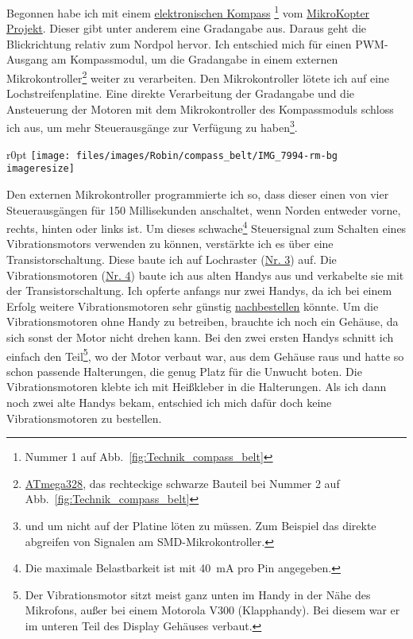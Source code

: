 Begonnen habe ich mit einem
\href{http://www.mikrokopter.de/ucwiki/MK3Mag}{elektronischen Kompass}%
\footnote{Nummer 1 auf Abb.~\vref{fig:Technik_compass_belt}}
vom \href{http://www.mikrokopter.de}{MikroKopter Projekt}.
Dieser gibt unter anderem eine Gradangabe aus. Daraus geht die Blickrichtung relativ zum Nordpol
hervor. Ich entschied mich für einen PWM-Ausgang am Kompassmodul, um die Gradangabe in einem
externen Mikrokontroller\footnote{\href{http://www.atmel.com/Images/doc8161.pdf}{ATmega328}, das
rechteckige schwarze Bauteil bei Nummer 2 auf Abb.~\vref{fig:Technik_compass_belt}}
weiter zu verarbeiten. Den Mikrokontroller lötete ich auf eine
Lochstreifenplatine. Eine direkte Verarbeitung der Gradangabe und die Ansteuerung der Motoren mit
dem Mikrokontroller des Kompassmoduls schloss ich aus, um mehr Steuerausgänge zur Verfügung zu
haben\footnote{und um nicht auf der Platine löten zu müssen. Zum Beispiel das direkte abgreifen
von Signalen am SMD-Mikrokontroller.}.

\begin{wrapfigure}{r}{0pt}
	\texttt{[image: files/images/Robin/compass\_belt/IMG\_7994-rm-bg\\imageresize]}
	\label{fig:Technik_compass_belt}
\end{wrapfigure}
Den externen Mikrokontroller programmierte ich so, dass dieser einen von vier Steuerausgängen
für 150 Millisekunden anschaltet, wenn Norden entweder vorne, rechts, hinten oder links ist.
Um dieses schwache\footnote{Die maximale Belastbarkeit ist mit \SI{40}{\milli\ampere} pro Pin
angegeben.}
Steuersignal zum Schalten eines Vibrationsmotors verwenden zu können, verstärkte ich es über eine
Transistorschaltung. Diese baute ich auf Lochraster (\hyperref[fig:Technik_compass_belt]{Nr. 3})
auf. Die Vibrationsmotoren (\hyperref[fig:Technik_compass_belt]{Nr. 4}) baute ich aus alten
Handys
aus und verkabelte sie mit der Transistorschaltung. Ich opferte anfangs nur zwei Handys, da ich
bei einem Erfolg weitere Vibrationsmotoren sehr günstig
\href{http://www.pollin.de/shop/dt/NDA2OTg2OTk-/Motoren/%
Gleichstrommotoren/Vibrationsmotor_LA4_432A.html}{nachbestellen}
könnte.
Um die Vibrationsmotoren ohne Handy zu betreiben, brauchte ich noch ein Gehäuse, da sich sonst der Motor
nicht drehen kann. Bei den zwei ersten Handys schnitt ich einfach den Teil\footnote{Der Vibrationsmotor
sitzt meist ganz unten im Handy in der Nähe des Mikrofons, außer bei einem Motorola V300 (Klapphandy). Bei
diesem war er im unteren Teil des Display Gehäuses verbaut.}, wo der Motor verbaut war, aus dem Gehäuse
raus und hatte so schon passende Halterungen, die genug Platz für die Unwucht boten. Die Vibrationsmotoren
klebte ich mit Heißkleber in die Halterungen. Als ich dann noch zwei alte Handys %
bekam, entschied ich mich dafür doch keine Vibrationsmotoren zu bestellen.

